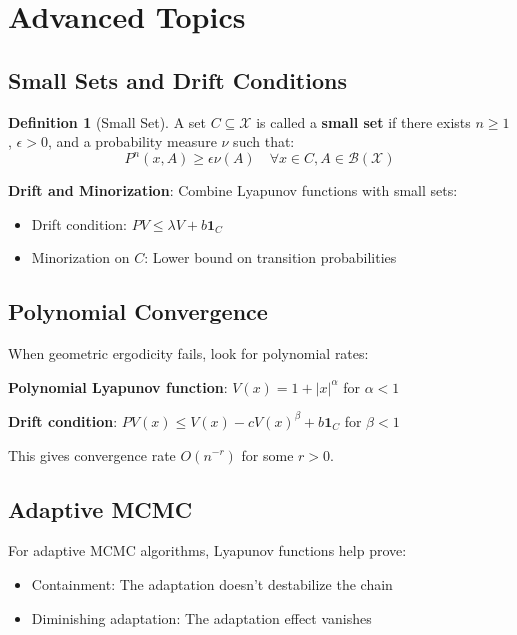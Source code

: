 \documentclass{amsart}
\theoremstyle{plain}
\theoremstyle{definition}
\newtheorem{definition}[theorem]{Definition}
\theoremstyle{remark}
\begin{document}
\section{Advanced Topics}

\subsection{Small Sets and Drift Conditions}

\begin{definition}[Small Set]
A set $C \subseteq \mathcal{X}$ is called a \textbf{small set} if there exists $n \geq 1$, $\epsilon > 0$, and a probability measure $\nu$ such that:
\[
P^n(x,A) \geq \epsilon \nu(A) \quad \forall x \in C, A \in \mathcal{B}(\mathcal{X})
\]
\end{definition}
\textbf{Drift and Minorization}: Combine Lyapunov functions with small sets:

\begin{itemize}
	\item Drift condition: $PV \leq \lambda V + b \mathbf{1}_C$
	\item Minorization on $C$: Lower bound on transition probabilities
\end{itemize}

\subsection{Polynomial Convergence}

When geometric ergodicity fails, look for polynomial rates:

\textbf{Polynomial Lyapunov function}: $V(x) = 1 + |x|^{\alpha}$ for $\alpha < 1$

\textbf{Drift condition}: $PV(x) \leq V(x) - c V(x)^{\beta} + b \mathbf{1}_C$ for $\beta < 1$

This gives convergence rate $O(n^{-r})$ for some $r > 0$.

\subsection{Adaptive MCMC}

For adaptive MCMC algorithms, Lyapunov functions help prove:

\begin{itemize}
	\item Containment: The adaptation doesn't destabilize the chain
	\item Diminishing adaptation: The adaptation effect vanishes
\end{itemize}
\end{document}
